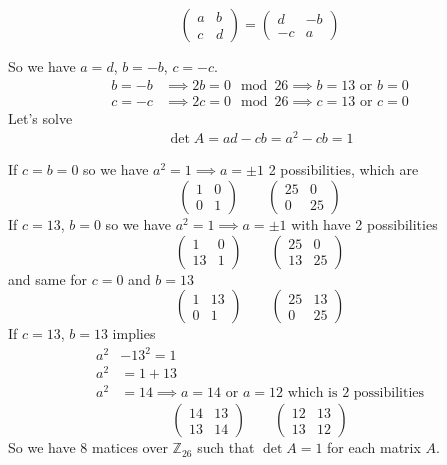 \documentclass[12pt,a4paper]{article}
\newcommand{\Z}{\mathbb{Z}}
\begin{document}
\[\begin{pmatrix}
	a&b\\c&d
\end{pmatrix}=\begin{pmatrix}
	d&-b\\-c&a
\end{pmatrix}\]

So we have $a=d$, $b=-b$, $c=-c$. 
\begin{align}
b=-b&\implies 2b=0 \mod 26\implies b=13 \text{ or } b=0\\
c=-c&\implies 2c=0 \mod 26\implies c=13 \text{ or } c=0
\end{align}
Let's solve \begin{align}
	\det A=ad-cb=a^2-cb=1 \label{eq 1}
\end{align}

If $c=b=0$ so we have $a^2=1\implies a=\pm 1$ 2 possibilities, which are 
\[\begin{pmatrix}
	1&0\\0&1
\end{pmatrix}\qquad\begin{pmatrix}
	25&0\\0&25
\end{pmatrix}\]
If $c=13$, $b=0$ so we have $a^2=1\implies a=\pm 1$ with have 2 possibilities 
\[\begin{pmatrix}
	1&0\\13&1
\end{pmatrix}\qquad\begin{pmatrix}
	25&0\\13&25
\end{pmatrix}\]
and same for $c=0$ and $b=13$ 
\[\begin{pmatrix}
	1&13\\0&1
\end{pmatrix}\qquad\begin{pmatrix}
	25&13\\0&25
\end{pmatrix}\]
If $c=13$, $b=13$ implies \begin{align}
a^2&-13^2=1\\
a^2&=1+13\\
a^2&=14\implies a=14 \text{ or } a=12 \text{ which is 2 possibilities}
\end{align} 
\[\begin{pmatrix}
	14&13\\13&14
\end{pmatrix}\qquad\begin{pmatrix}
	12&13\\13&12
\end{pmatrix}\]
So we have 8 matices over $\Z_{26}$ such that $\det A=1$ for each matrix $A$.
\end{document}
